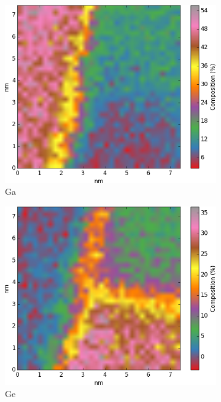 \begin{figure}
\begin{subfigure}{0.45\textwidth}
		\includegraphics[width=\textwidth]{fig/q/D-E-trim/E_heatedGeKlineHEATMAP/Ga_zeta}
		\caption{Ga}
		\label{fig:Ega}
	\end{subfigure}%
	\hfill
	\begin{subfigure}{0.45\textwidth}
		\includegraphics[width=\textwidth]{fig/q/D-E-trim/E_heatedGeKlineHEATMAP/Ge_zeta}
		\caption{Ge}
		\label{fig:Ege}
	\end{subfigure}
	\begin{subfigure}{0.45\textwidth}

\end{subfigure}
\end{figure}
